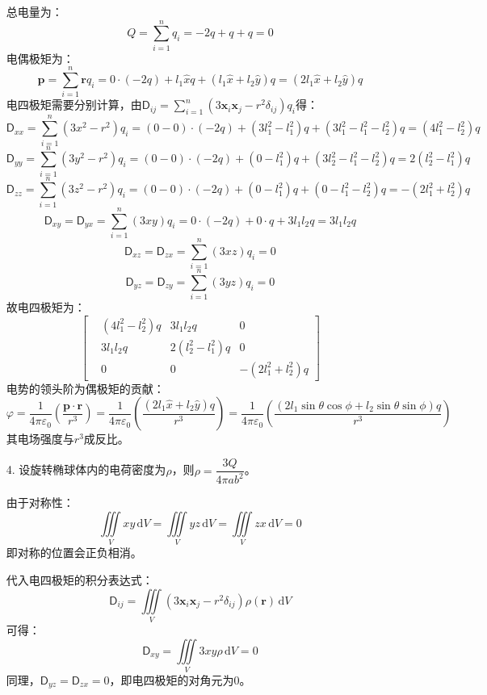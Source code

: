 \documentclass[a4paper,fontset=none]{ctexart}
\begin{document}
\begin{itemize}
        总电量为：
        \[
        Q = \sum_{i=1}^n q_i = -2q + q + q = 0
        \]
        电偶极矩为：
        \[
        \bm{p} = \sum_{i=1}^n \bm{r}q_i = 0\cdot(-2q) + l_1\hat{x}q + (l_1\hat{x}+l_2\hat{y})q = (2l_1\hat{x} + l_2\hat{y})q
        \]
        电四极矩需要分别计算，由$\mathsf{D}_{ij}=\sum\limits_{i=1}^n (3\bm{x}_i\bm{x}_j - r^2\delta_{ij})q_i$得：
        \[
        \mathsf{D}_{xx} = \sum_{i=1}^n (3x^2 - r^2)q_i = (0-0)\cdot(-2q) + (3l_1^2-l_1^2)q + (3l_1^2-l_1^2-l_2^2)q = (4l_1^2-l_2^2)q
        \]
        \[
        \mathsf{D}_{yy} = \sum_{i=1}^n (3y^2 - r^2)q_i = (0-0)\cdot(-2q) + (0-l_1^2)q + (3l_2^2-l_1^2-l_2^2)q = 2(l_2^2-l_1^2)q
        \]
        \[
        \mathsf{D}_{zz} = \sum_{i=1}^n (3z^2 - r^2)q_i = (0-0)\cdot(-2q) + (0-l_1^2)q + (0-l_1^2-l_2^2)q = -(2l_1^2+l_2^2)q
        \]
        \[
        \mathsf{D}_{xy} = \mathsf{D}_{yx} = \sum_{i=1}^n (3xy)q_i = 0\cdot(-2q) + 0\cdot q + 3l_1l_2q = 3l_1l_2q
        \]
        \[
        \mathsf{D}_{xz} = \mathsf{D}_{zx} = \sum_{i=1}^n (3xz)q_i = 0
        \]
        \[
        \mathsf{D}_{yz} = \mathsf{D}_{zy} = \sum_{i=1}^n (3yz)q_i = 0
        \]
        故电四极矩为：
        \[
        \begin{bmatrix}
            & (4l_1^2-l_2^2)q & 3l_1l_2q & 0 \\
            & 3l_1l_2q & 2(l_2^2-l_1^2)q & 0 \\
            & 0 & 0 & -(2l_1^2+l_2^2)q
        \end{bmatrix}
        \]
        电势的领头阶为偶极矩的贡献：
        \[
        \varphi = \frac{1}{4\pi\varepsilon_0}\left(\frac{\bm{p}\cdot\bm{r}}{r^3}\right) = \frac{1}{4\pi\varepsilon_0}\left(\frac{(2l_1\hat{x} + l_2\hat{y})q}{r^3}\right) = \frac{1}{4\pi\varepsilon_0}\left(\frac{(2l_1\sin\theta\cos\phi+l_2\sin\theta\sin\phi)q}{r^3}\right)
        \]
        其电场强度与$r^3$成反比。

        \item[4.]
        设旋转椭球体内的电荷密度为$\rho$，则$\rho=\dfrac{3Q}{4\pi ab^2}$。

        由于对称性：
        \[
        \iiint\limits_V xy\,\mathrm{d}V = \iiint\limits_V yz\,\mathrm{d}V = \iiint\limits_V zx\,\mathrm{d}V = 0
        \]
        即对称的位置会正负相消。

        代入电四极矩的积分表达式：
        \[
        \mathsf{D}_{ij} = \iiint\limits_V (3\bm{x}_i\bm{x}_j-r^2\delta_{ij})\rho(\bm{r})\,\mathrm{d}V
        \]
        可得：
        \[
        \mathsf{D}_{xy} = \iiint\limits_V 3xy\rho\,\mathrm{d}V = 0
        \]
        同理，$\mathsf{D}_{yz}=\mathsf{D}_{zx}=0$，即电四极矩的对角元为0。


\end{itemize}
\end{document}
